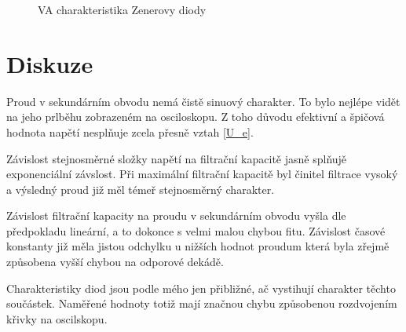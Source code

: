 \documentclass[a4paper,12pt]{article}
\begin{document}
\begin{figure}
\begin{center}

\end{center}
\caption{VA charakteristika Zenerovy diody}
\label{g4}
\end{figure}

\section{Diskuze}

Proud v sekundárním obvodu nemá čistě sinuový charakter. To bylo nejlépe vidět na jeho prlběhu 
zobrazeném na osciloskopu. Z toho důvodu efektivní a špičová hodnota napětí nesplňuje zcela 
přesně vztah \ref{U_e}.

Závislost stejnosměrné složky napětí na filtrační kapacitě jasně splňujě exponenciální závslost. 
Při maximální filtrační kapacitě byl činitel filtrace vysoký a výsledný proud již měl témeř 
stejnosměrný charakter.

Závislost filtrační kapacity na proudu v sekundárním obvodu vyšla dle předpokladu lineární, a to 
dokonce s velmi malou chybou fitu. Závislost časové konstanty již měla jistou odchylku u nižších 
hodnot proudum která byla zřejmě způsobena vyšší chybou na odporové dekádě.

Charakteristiky diod jsou podle mého jen přibližné, ač vystihují charakter těchto součástek. 
Naměřené hodnoty totiž mají značnou chybu způsobenou rozdvojením křivky na oscilskopu. 
\end{document}
